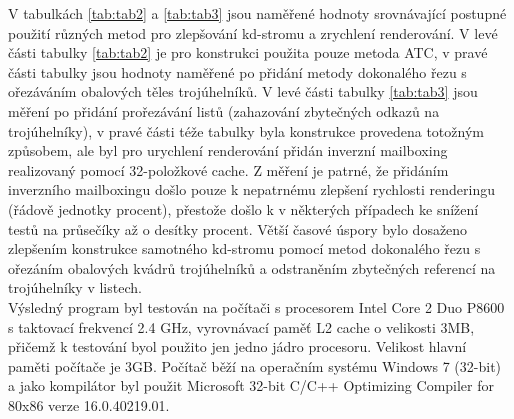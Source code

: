 \documentclass[report,11pt]{elsarticle}
\begin{document}
V tabulkách \ref{tab:tab2} a \ref{tab:tab3} jsou naměřené hodnoty srovnávající postupné použití různých metod pro zlepšování kd-stromu a zrychlení renderování. V levé části tabulky \ref{tab:tab2} je pro konstrukci použita pouze metoda ATC, v pravé části tabulky jsou hodnoty naměřené po přidání metody dokonalého řezu s ořezáváním obalových těles trojúhelníků. V levé části tabulky \ref{tab:tab3} jsou měření po přidání prořezávání listů (zahazování zbytečných odkazů na trojúhelníky), v pravé části téže tabulky byla konstrukce provedena totožným způsobem, ale byl pro urychlení renderování přidán inverzní mailboxing realizovaný pomocí 32-položkové cache. Z měření je patrné, že přidáním inverzního mailboxingu došlo pouze k nepatrnému zlepšení rychlosti renderingu (řádově jednotky procent), přestože došlo k v některých případech ke snížení testů na průsečíky až o desítky procent. Větší časové úspory bylo dosaženo zlepšením konstrukce samotného kd-stromu pomocí metod dokonalého řezu s ořezáním obalových kvádrů trojúhelníků a odstraněním zbytečných referencí na trojúhelníky v listech.\\

Výsledný program byl testován na počítači s procesorem Intel Core 2 Duo P8600 s taktovací frekvencí 2.4 GHz, vyrovnávací paměť L2 cache o velikosti 3MB, přičemž k testování byol použito jen jedno jádro procesoru. Velikost hlavní paměti počítače je 3GB. Počítač běží na operačním systému Windows 7 (32-bit)  a jako kompilátor byl použit Microsoft 32-bit C/C++ Optimizing Compiler for 80x86 verze 16.0.40219.01.\\
\end{document}
